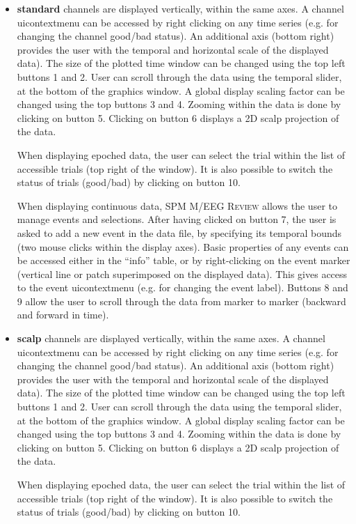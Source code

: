 \begin{itemize}
\item{\textbf{standard}}
channels are displayed vertically, within the same axes. A channel uicontextmenu can be accessed by right clicking on any time series (e.g. for changing the channel good/bad status). An additional axis (bottom right) provides the user with the temporal and horizontal scale of the displayed data). The size of the plotted time window can be changed using the top left buttons 1 and 2. User can scroll through the data using the temporal slider, at the bottom of the graphics window. A global display scaling factor can be changed using the top buttons 3 and 4. Zooming within the data is done by clicking on button 5. Clicking on button 6 displays a 2D scalp projection of the data.

When displaying epoched data, the user can select the trial within the list of accessible trials (top right of the window). It is also possible to switch the status of trials (good/bad) by clicking on button 10.

When displaying continuous data, SPM M/EEG \textsc{Review} allows the user to manage events and selections. After having clicked on button 7, the user is asked to add a new event in the data file, by specifying its temporal bounds (two mouse clicks within the display axes). Basic properties of any events can be accessed either in the ``info'' table, or by right-clicking on the event marker (vertical line or patch superimposed on the displayed data). This gives access to the event uicontextmenu (e.g. for changing the event label). Buttons 8 and 9 allow the user to scroll through the data from marker to marker (backward and forward in time).

\item{\textbf{scalp}}
channels are displayed vertically, within the same axes. A channel uicontextmenu can be accessed by right clicking on any time series (e.g. for changing the channel good/bad status). An additional axis (bottom right) provides the user with the temporal and horizontal scale of the displayed data). The size of the plotted time window can be changed using the top left buttons 1 and 2. User can scroll through the data using the temporal slider, at the bottom of the graphics window. A global display scaling factor can be changed using the top buttons 3 and 4. Zooming within the data is done by clicking on button 5. Clicking on button 6 displays a 2D scalp projection of the data.

When displaying epoched data, the user can select the trial within the list of accessible trials (top right of the window). It is also possible to switch the status of trials (good/bad) by clicking on button 10.
\end{itemize}

